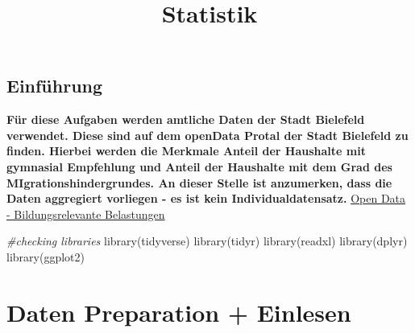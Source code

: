 \documentclass[
]{article}
\title{Statistik}
\author{}
\date{\vspace{-2.5em}}
\newenvironment{Shaded}{\begin{snugshade}}{\end{snugshade}}
\newcommand{\CommentTok}[1]{\textcolor[rgb]{0.56,0.35,0.01}{\textit{#1}}}
\newcommand{\FunctionTok}[1]{\textcolor[rgb]{0.00,0.00,0.00}{#1}}
\newcommand{\NormalTok}[1]{#1}
\begin{document}
\maketitle

\hypertarget{einfuxfchrung}{%
\subsection{Einführung}\label{einfuxfchrung}}

\textbf{Für diese Aufgaben werden amtliche Daten der Stadt Bielefeld
verwendet. Diese sind auf dem openData Protal der Stadt Bielefeld zu
finden. Hierbei werden die Merkmale Anteil der Haushalte mit gymnasial
Empfehlung und Anteil der Haushalte mit dem Grad des
MIgrationshindergrundes. An dieser Stelle ist anzumerken, dass die Daten
aggregiert vorliegen - es ist kein Individualdatensatz.}
\href{https://open-data.bielefeld.de/dataset/bildungsrelevante-belastungen}{Open
Data - Bildungsrelevante Belastungen}

\begin{Shaded}
\begin{Highlighting}[]
\CommentTok{\#checking libraries}
\FunctionTok{library}\NormalTok{(tidyverse)}
\FunctionTok{library}\NormalTok{(tidyr)}
\FunctionTok{library}\NormalTok{(readxl)}
\FunctionTok{library}\NormalTok{(dplyr)}
\FunctionTok{library}\NormalTok{(ggplot2)}
\end{Highlighting}
\end{Shaded}

\hypertarget{daten-preparation-einlesen}{%
\section{Daten Preparation +
Einlesen}\label{daten-preparation-einlesen}}
\end{document}
